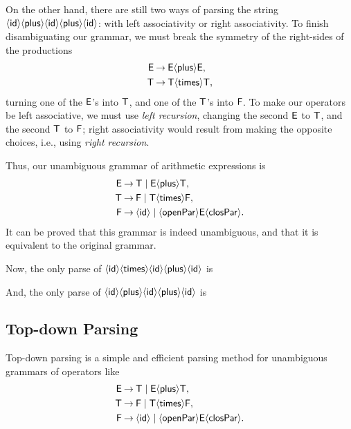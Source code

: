 On the other hand, there are still two ways of parsing the string
$\idsym\plussym\idsym\plussym\idsym$: with left associativity or right
associativity.  To finish disambiguating our grammar, we must break
the symmetry of the right-sides of the productions
\begin{align*}
  \Esf &\fun \Esf\plussym\Esf , \\
  \Tsf &\fun \Tsf\timessym\Tsf ,
\end{align*}
turning one of the $\Esf$'s into $\Tsf$, and one of the $\Tsf$'s into
$\Fsf$.  To make our operators be left associative, we must use
\emph{left recursion}, changing the second $\Esf$ to $\Tsf$, and the
second $\Tsf$ to $\Fsf$; right associativity would result from making
the opposite choices, i.e., using \emph{right recursion}.

Thus, our unambiguous grammar of arithmetic expressions is
\begin{align*}
\Esf &\fun \Tsf \mid \Esf\plussym\Tsf , \\
\Tsf &\fun \Fsf \mid \Tsf\timessym\Fsf , \\
\Fsf &\fun \idsym \mid \openparsym\Esf\closparsym .
\end{align*}
It can be proved that this grammar is indeed unambiguous, and that it
is equivalent to the original grammar.

Now, the only parse of $\idsym\timessym\idsym\plussym\idsym$ is
\begin{center}

\end{center}
And, the only parse of $\idsym\plussym\idsym\plussym\idsym$
is
\begin{center}

\end{center}

\subsection{Top-down Parsing}

%
%
Top-down parsing is a simple and efficient parsing method for
unambiguous grammars of operators like
\begin{align*}
\Esf &\fun \Tsf \mid \Esf\plussym\Tsf , \\
\Tsf &\fun \Fsf \mid \Tsf\timessym\Fsf , \\
\Fsf &\fun \idsym \mid \openparsym\Esf\closparsym .
\end{align*}

